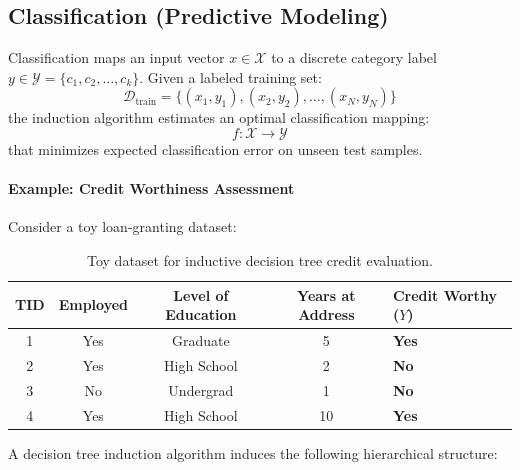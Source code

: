 \subsection{Classification (Predictive Modeling)}
Classification maps an input vector $x \in \mathcal{X}$ to a discrete category label $y \in \mathcal{Y} = \{c_1, c_2, \dots, c_k\}$. Given a labeled training set:
\begin{equation}
    \mathcal{D}_{\text{train}} = \{(x_1, y_1), (x_2, y_2), \dots, (x_N, y_N)\}
\end{equation}
the induction algorithm estimates an optimal classification mapping:
\begin{equation}
    f: \mathcal{X} \to \mathcal{Y}
\end{equation}
that minimizes expected classification error on unseen test samples.

\paragraph{Example: Credit Worthiness Assessment}
Consider a toy loan-granting dataset:

\begin{table}[H]
\centering
\small
\begin{tabularx}{\textwidth}{c c c c Y}
\toprule
\textbf{TID} & \textbf{Employed} & \textbf{Level of Education} & \textbf{Years at Address} & \textbf{Credit Worthy ($Y$)} \\
 & Yes & Graduate & 5 & \textbf{Yes} \\
2 & Yes & High School & 2 & \textbf{No} \\
3 & No & Undergrad & 1 & \textbf{No} \\
4 & Yes & High School & 10 & \textbf{Yes} \\
\bottomrule
\end{tabularx}
\caption{Toy dataset for inductive decision tree credit evaluation.}
\label{tab:credit-worthiness-en}
\end{table}

A decision tree induction algorithm induces the following hierarchical structure:

